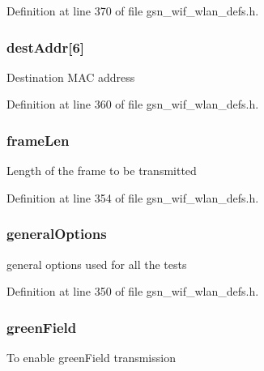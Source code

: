 Definition at line 370 of file gsn\_\-wif\_\-wlan\_\-defs.h.

\hypertarget{a00190_a8b13c9d995b3a022c8481b2e0c972ae0}{
\subsubsection[{destAddr}]{ {\bf destAddr}\mbox{[}6\mbox{]}}}
\label{a00190_a8b13c9d995b3a022c8481b2e0c972ae0}
Destination MAC address 

Definition at line 360 of file gsn\_\-wif\_\-wlan\_\-defs.h.

\hypertarget{a00190_ad7d37183f86bdd7a3c11db21c3301b32}{
\subsubsection[{frameLen}]{ {\bf frameLen}}}
\label{a00190_ad7d37183f86bdd7a3c11db21c3301b32}
Length of the frame to be transmitted 

Definition at line 354 of file gsn\_\-wif\_\-wlan\_\-defs.h.

\hypertarget{a00190_a5e4e9e8d2b76fbb6bdf201c4aeddd60d}{
\subsubsection[{generalOptions}]{ {\bf generalOptions}}}
\label{a00190_a5e4e9e8d2b76fbb6bdf201c4aeddd60d}
general options used for all the tests 

Definition at line 350 of file gsn\_\-wif\_\-wlan\_\-defs.h.

\hypertarget{a00190_a1616fda9db33a672fcd0096af9760f68}{
\subsubsection[{greenField}]{ {\bf greenField}}}
\label{a00190_a1616fda9db33a672fcd0096af9760f68}
To enable greenField transmission 

